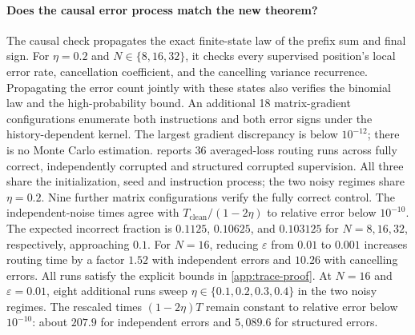 \paragraph{Does the causal error process match the new theorem?}
The causal check propagates the exact finite-state law of the prefix sum and final sign.
For $\eta=0.2$ and $N\in\{8,16,32\}$, it checks every supervised position's local error rate, cancellation coefficient, and the cancelling variance recurrence.
Propagating the error count jointly with these states also verifies the binomial law and the high-probability bound.
An additional 18 matrix-gradient configurations enumerate both instructions and both error signs under the history-dependent kernel.
The largest gradient discrepancy is below $10^{-12}$; there is no Monte Carlo estimation.
 reports 36 averaged-loss routing runs across fully correct, independently corrupted and structured corrupted supervision.
All three share the initialization, seed and instruction process; the two noisy regimes share $\eta=0.2$.
Nine further matrix configurations verify the fully correct control.
The independent-noise times agree with $T_{\mathrm{clean}}/(1-2\eta)$ to relative error below $10^{-10}$.
The expected incorrect fraction is $0.1125$, $0.10625$, and $0.103125$ for $N=8,16,32$, respectively, approaching $0.1$.
For $N=16$, reducing $\varepsilon$ from $0.01$ to $0.001$ increases routing time by a factor $1.52$ with independent errors and $10.26$ with cancelling errors.
All runs satisfy the explicit bounds in \cref{app:trace-proof}.
At $N=16$ and $\varepsilon=0.01$, eight additional runs sweep $\eta\in\{0.1,0.2,0.3,0.4\}$ in the two noisy regimes.
The rescaled times $(1-2\eta)T$ remain constant to relative error below $10^{-10}$: about $207.9$ for independent errors and $5{,}089.6$ for structured errors.

\begin{table}[t]
\centering\small
\caption{Correct computation from clean and corrupted reasoning supervision. The clean control has no errors; both noisy regimes have local error rate $\eta=0.2$.
The same block parameters train on all $N$ selected positions. Times reach source attention $\tfrac{1}{2}$ on every prefix; the final column compares structured errors with clean supervision.}
\label{tab:causal-flow}

\end{table}

